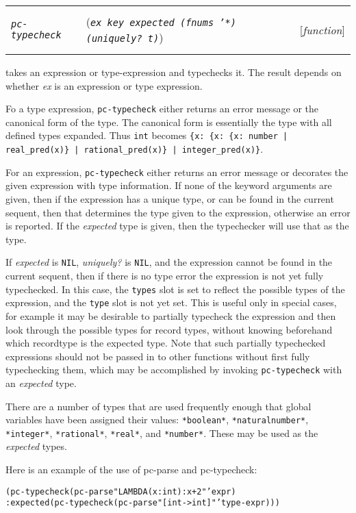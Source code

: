 \documentclass[12pt]{book}
\makeatletter
\def\ampkey{{\smaller\sc {\smaller\smaller \&}key\ }}
\newenvironment{function}[3]%
{\par\noindent\begin{boxedminipage}{\textwidth}%
 \par\noindent\begin{tabularx}{\linewidth}{l>{\raggedright}Xr}%
 \functionhtgt{#1}&(\texttt{\textit{#2}})&[\emph{#3}]%
 \end{tabularx}\par\flushright\begin{minipage}{.97\textwidth}}
{\end{minipage}\end{boxedminipage}}
\newcommand{\functionnm}[1]{\texttt{\textit{#1}}}
\newcommand{\functionhtgt}[1]{\hypertarget{#1}{\functionnm{#1}}\index{#1@\functionnm{#1}|underline}}
\newenvironment{lispfunction}[2]%
{\begin{function}{#1}{#2}{function}}{\end{function}}
\makeatother
\begin{document}
\begin{lispfunction}{pc-typecheck}
{ex \ampkey expected \textup{(}fnums \textup{'*}\textup{)}
 \textup{(}uniquely? \textup{t}\textup{)}}
takes an expression or type-expression and typechecks it.  The result
depends on whether \emph{ex} is an expression or type expression.

Fo a type expression, \texttt{pc-typecheck} either returns an error
message or the canonical form of the type.  The canonical form is
essentially the type with all defined types expanded.  Thus \texttt{int}
becomes \texttt{\{x: \{x: \{x: number | real\_pred(x)\} |
rational\_pred(x)\} | integer\_pred(x)\}}.

For an expression, \texttt{pc-typecheck} either returns an error message
or decorates the given expression with type information.  If none of the
keyword arguments are given, then if the expression has a unique type, or
can be found in the current sequent, then that determines the type given
to the expression, otherwise an error is reported.  If the \emph{expected}
type is given, then the typechecker will use that as the type.

If \emph{expected} is \texttt{NIL}, \emph{uniquely?} is \texttt{NIL}, and
the expression cannot be found in the current sequent, then if there is no
type error the expression is not yet fully typechecked.  In this case, the
\texttt{types} slot is set to reflect the possible types of the
expression, and the \texttt{type} slot is not yet set.  This is useful
only in special cases, for example it may be desirable to partially
typecheck the expression and then look through the possible types for
record types, without knowing beforehand which recordtype is the expected
type.  Note that such partially typechecked expressions should not be
passed in to other functions without first fully typechecking them, which
may be accomplished by invoking \texttt{pc-typecheck} with an
\emph{expected} type.

There are a number of types that are used frequently enough that global
variables have been assigned their values: \texttt{*boolean*},
\texttt{*naturalnumber*}, \texttt{*integer*}, \texttt{*rational*},
\texttt{*real*}, and \texttt{*number*}.  These may be used as the
\emph{expected} types.
\end{lispfunction}

Here is an example of the use of pc-parse and pc-typecheck:
\begin{alltt}
  (pc-typecheck (pc-parse "LAMBDA (x:int): x + 2" 'expr)
                :expected (pc-typecheck (pc-parse "[int -> int]" 'type-expr)))
\end{alltt}
\end{document}
